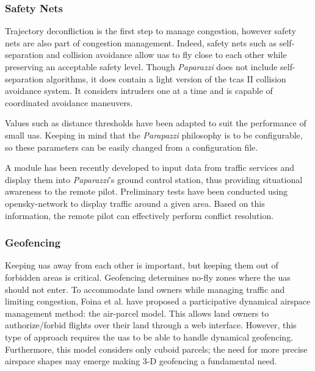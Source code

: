 	\subsubsection{Safety Nets}
		Trajectory deconfliction is the first step to manage congestion, however safety nets are also part of congestion management. Indeed, safety nets such as self-separation and collision avoidance allow \gls{uas} to fly close to each other while preserving an acceptable safety level.
		Though \emph{Paparazzi} does not include self-separation algorithms, it does contain a light version of the \gls{tcas} II collision avoidance system. It considers intruders one at a time and is capable of coordinated avoidance maneuvers. 

		Values such as distance thresholds have been adapted to suit the performance of small \gls{uas}. 
		Keeping in mind that the \emph{Parapazzi} philosophy is to be configurable, so these parameters can be easily changed from a configuration file.

	A module has been recently developed to input data from traffic services and display them into \emph{Paparazzi}'s ground control station, thus providing situational awareness to the remote pilot. Preliminary tests have been conducted using opensky-network to display traffic around a given area. Based on this information, the remote pilot can effectively perform conflict resolution.

	\subsubsection{Geofencing}
		Keeping \gls{uas} away from each other is important, but keeping them out of forbidden areas is critical.	Geofencing determines no-fly zones where the \gls{uas} should not enter.
		To accommodate land owners while managing traffic and limiting congestion, Foina et al. \cite{foina_air_parcelle_2015} have proposed a participative dynamical airspace management method: the air-parcel model. This allows land owners to authorize/forbid flights over their land through a web interface. 
		However, this type of approach requires the \gls{uas} to be able to handle dynamical geofencing. Furthermore, this model considers only cuboid parcels; the need for more precise airspace shapes may emerge making 3-D geofencing a fundamental need.
		
